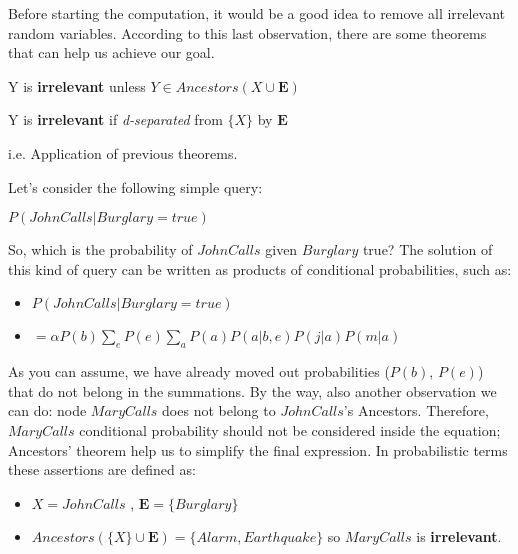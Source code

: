 Before starting the computation, it would be a good idea to remove all irrelevant random variables. According to this last observation,
there are some theorems that can help us achieve our goal.
\begin{definition}[title={Theorem}]
    Y is \textbf{irrelevant} unless $Y \in Ancestors({X} \cup \mathbf{E})$
\end{definition}
\begin{definition}[title={Theorem}]
    Y is \textbf{irrelevant} if \textit{d-separated} from $\{X\}$ by $\mathbf{E}$
\end{definition}
\begin{example}
    i.e. Application of previous theorems.

    Let's consider the following simple query: \vspace{3.5pt}
    \begin{center}
        $P(JohnCalls|Burglary = true)$
    \end{center} \vspace{3.5pt}
    So, which is the probability of $JohnCalls$ given $Burglary$ true? The solution of this kind of query can be written as products of conditional probabilities, such as: \vspace{7pt}
    \begin{itemize}
        \renewcommand{\labelitemi}{}
        \item $P(JohnCalls|Burglary = true)$
        \item $= \alpha P(b) \sum_{e}P(e) \sum_{a}P(a) P(a|b,e) P(j|a) P(m|a)$
    \end{itemize} \vspace{3.5pt}
    As you can assume, we have already moved out probabilities ($P(b)$, $P(e)$) that do not belong in the summations. By the way, also another observation we can do: node $MaryCalls$
    does not belong to $JohnCalls$'s Ancestors. Therefore, $MaryCalls$ conditional probability should not be considered inside the equation; Ancestors' theorem help us to simplify the
    final expression. In probabilistic terms these assertions are defined as: \vspace{3.5pt}
    \begin{itemize}
        \renewcommand{\labelitemi}{}
        \item $X = JohnCalls$ , $\mathbf{E}=\{Burglary\}$
        \item $Ancestors(\{X\} \cup \mathbf{E}) = \{Alarm, Earthquake\}$ so $MaryCalls$ is \textbf{irrelevant}.
    \end{itemize} \vspace{3.5pt}

\end{example}
